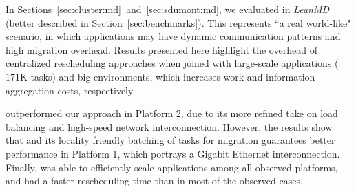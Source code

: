 
In Sections~\ref{sec:cluster:md}~and~\ref{sec:sdumont:md}, we evaluated \packdrop in \textit{LeanMD} (better described in Section~\ref{sec:benchmarks}).
This represents ``a real world-like" scenario, in which applications may have dynamic communication patterns and high migration overhead.
Results presented here highlight the overhead of centralized rescheduling approaches when joined with large-scale applications ($171$K tasks) and big environments, which increases work and information aggregation costs, respectively.

\distributedlb outperformed our approach in Platform 2, due to its more refined take on load balancing and high-speed network interconnection.
However, the results show that \packdrop and its locality friendly batching of tasks for migration guarantees better performance in Platform 1, which portrays a Gigabit Ethernet interconnection.
Finally, \packdrop was able to efficiently scale applications among all observed platforms, and had a faster rescheduling time than \distributedlb in most of the observed cases.

